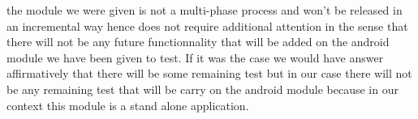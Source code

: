the module we were given is not a multi-phase process  and won't be released in an incremental way hence does not require additional attention in the sense that there will not be any future functionnality that will be added on the android module we have been given to test. If it was the case we would have answer affirmatively that there will be some remaining test but in our case there will not be any remaining test that will be carry on the android module because in our context this module is a stand alone application.  